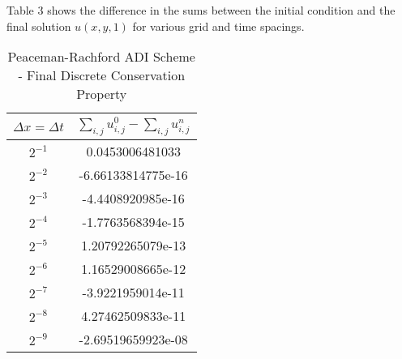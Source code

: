 \documentclass[12pt]{article}
\begin{document}
\begin{enumerate}[(a)]
Table 3 shows the difference in the sums between the initial condition and the final solution $u(x,y,1)$ for various grid and time spacings.
\begin{table}[H]
\caption{Peaceman-Rachford ADI Scheme - Final Discrete Conservation Property}
\centering\begin{tabular}{|cc|}
\hline \hline
   $\Delta x = \Delta t$ & $\sum_{i,j} u_{i,j}^0 - \sum_{i,j} u^n_{i,j}$  \\
\hline
                 $2^{-1}$  & 0.0453006481033    \\
                 $2^{-2}$  & -6.66133814775e-16 \\
                 $2^{-3}$  & -4.4408920985e-16  \\
                 $2^{-4}$  & -1.7763568394e-15  \\
                 $2^{-5}$  & 1.20792265079e-13  \\
                 $2^{-6}$  & 1.16529008665e-12  \\
                 $2^{-7}$  & -3.9221959014e-11  \\
                 $2^{-8}$  & 4.27462509833e-11  \\
                 $2^{-9}$  & -2.69519659923e-08 \\

\hline \hline
\end{tabular}
\end{table}
\end{enumerate}
\end{document}
